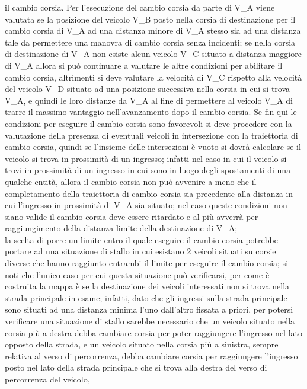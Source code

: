 \begin{enumerate}
\begin{enumerate}
il cambio corsia. Per l'esecuzione del cambio corsia da parte di V\_A viene
valutata se la posizione del veicolo V\_B posto nella corsia di destinazione
per il cambio corsia di V\_A ad una distanza minore di V\_A stesso sia ad una
distanza tale da permettere una manovra di cambio corsia senza incidenti; se
nella corsia di destinazione di V\_A non esiste alcun veicolo V\_C situato a
distanza maggiore di V\_A allora si può continuare a valutare le altre
condizioni per abilitare il cambio corsia, altrimenti si deve valutare la
velocità di V\_C rispetto alla velocità del veicolo V\_D situato ad una
posizione successiva nella corsia in cui si trova V\_A, e quindi le loro
distanze da V\_A al fine di permettere al veicolo V\_A di trarre il massimo
vantaggio nell'avanzamento dopo il cambio corsia. Se fin qui le condizioni per
eseguire il cambio corsia sono favorevoli si deve procedere con la valutazione
della presenza di eventuali veicoli in intersezione con la traiettoria di
cambio corsia, quindi se l'insieme delle intersezioni è vuoto si dovrà
calcolare se il veicolo si trova in prossimità di un ingresso; infatti nel caso
in cui il veicolo si trovi in prossimità di un ingresso in cui sono in luogo
degli spostamenti di una qualche entità, allora il cambio corsia non può
avvenire a meno che il completamento della traiettoria di cambio corsia sia
precedente alla distanza in cui l'ingresso in prossimità di V\_A sia situato;
nel caso queste condizioni non siano valide il cambio corsia deve essere
ritardato e al più avverrà per raggiungimento della distanza limite della
destinazione di V\_A;\\
la scelta di porre un limite entro il quale eseguire il cambio corsia potrebbe
portare ad una situazione di stallo in cui esistano 2 veicoli situati su corsie
diverse che hanno raggiunto entrambi il limite per eseguire il cambio corsia;
si noti che l'unico caso per cui questa situazione può verificarsi, per come è
costruita la mappa è se la destinazione dei veicoli interessati non si trova
nella strada principale in esame; infatti, dato che gli ingressi sulla strada
principale sono situati ad una distanza minima l'uno dall'altro fissata a
priori, per potersi verificare una situazione di stallo sarebbe necessario che
un veicolo situato nella corsia più a destra debba cambiare corsia per poter
raggiungere l'ingresso nel lato opposto della strada, e un veicolo situato
nella corsia più a sinistra, sempre relativa al verso di percorrenza, debba
cambiare corsia per raggiungere l'ingresso posto nel lato della strada
principale che si trova alla destra del verso di percorrenza del veicolo,

\end{enumerate}
\end{enumerate}
